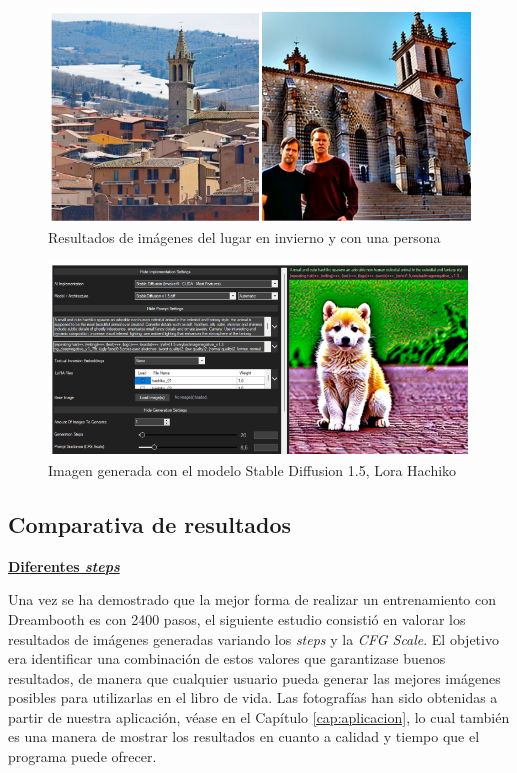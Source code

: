 \begin{figure}[!htb]
	\centering
	\includegraphics[width = 1
	\textwidth]{Imagenes/Vectorial/colmenar_elements.png}
	\caption{Resultados de imágenes del lugar en invierno y con una persona}
	\label{fig:elementscolme}
\end{figure}


\begin{figure}[!htb]
	\centering
	\includegraphics[width = 1
	\textwidth]{Imagenes/Vectorial/hachiko_detallada.png}
	\caption{Imagen generada con el modelo Stable Diffusion 1.5, Lora Hachiko}
	\label{fig:detallehachi}
\end{figure}

\subsection{Comparativa de resultados}

\textbf{\underline{Diferentes \textit{steps}}}

Una vez se ha demostrado que la mejor forma de realizar un entrenamiento con Dreambooth es con 2400 pasos, el siguiente estudio consistió en valorar los resultados de imágenes generadas variando los \textit{steps} y la\textit{ CFG Scale}. El objetivo era identificar una combinación de estos valores que garantizase buenos resultados, de manera que cualquier usuario pueda generar las mejores imágenes posibles para utilizarlas en el libro de vida. Las fotografías han sido obtenidas a partir de nuestra aplicación, véase en el Capítulo \ref{cap:aplicacion}, lo cual también es una manera de mostrar los resultados en cuanto a calidad y tiempo que el programa puede ofrecer.

